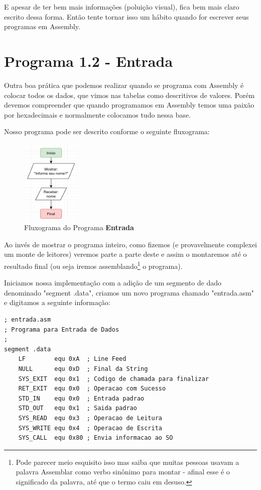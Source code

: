 E apesar de ter bem mais informações (poluição visual), fica bem mais claro escrito dessa forma. Então tente tornar isso um hábito quando for escrever seus programas em Assembly.

\section{Programa 1.2 - Entrada}
Outra boa prática que podemos realizar quando se programa com Assembly é colocar todos os dados, que vimos nas tabelas como descritivos de valores. Porém devemos compreender que quando programamos em Assembly temos uma paixão por hexadecimais e normalmente colocamos tudo nessa base.

Nosso programa pode ser descrito conforme o seguinte fluxograma:
\begin{figure}[H]
	\centering
	\includegraphics[width=0.25\textwidth]{Pictures/cap01/programa2}
	\caption{Fluxograma do Programa \textbf{Entrada}}
\end{figure}

Ao invés de mostrar o programa inteiro, como fizemos (e provavelmente complexei um monte de leitores) veremos parte a parte deste e assim o montaremos até o resultado final (ou seja iremos assemblando\footnote{Pode parecer meio esquisito isso mas saiba que muitas pessoas usavam a palavra Assemblar como verbo sinônimo para montar - afinal esse é o significado da palavra, até que o termo caiu em desuso.} o programa).

Iniciamos nossa implementação com a adição de um segmento de dado denominado "segment .data", criamos um novo programa chamado "entrada.asm" e digitamos a seguinte informação:
\begin{lstlisting}[]
; entrada.asm	
; Programa para Entrada de Dados
;
segment .data
	LF        equ 0xA  ; Line Feed
	NULL      equ 0xD  ; Final da String
	SYS_EXIT  equ 0x1  ; Codigo de chamada para finalizar
	RET_EXIT  equ 0x0  ; Operacao com Sucesso
	STD_IN    equ 0x0  ; Entrada padrao
	STD_OUT   equ 0x1  ; Saida padrao
	SYS_READ  equ 0x3  ; Operacao de Leitura
	SYS_WRITE equ 0x4  ; Operacao de Escrita
	SYS_CALL  equ 0x80 ; Envia informacao ao SO
\end{lstlisting}

